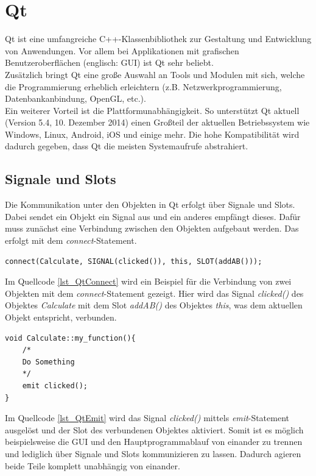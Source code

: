 \section{Qt}
\label{section_Qt}
Qt \cite{qtproject} ist eine umfangreiche C++-Klassenbibliothek zur Gestaltung und Entwicklung von Anwendungen. Vor allem bei Applikationen mit grafischen Benutzeroberflächen (englisch: \ac{GUI}) ist Qt sehr beliebt. \\
Zusätzlich bringt Qt eine große Auswahl an Tools und Modulen mit sich, welche die Programmierung erheblich erleichtern (z.B. Netzwerkprogrammierung, Datenbankanbindung, OpenGL, etc.). \\
Ein weiterer Vorteil ist die Plattformunabhängigkeit. So unterstützt Qt aktuell (Version 5.4, 10. Dezember 2014) einen Großteil der aktuellen Betriebssystem wie Windows, Linux, Android, iOS und einige mehr. Die hohe Kompatibilität wird dadurch gegeben, dass Qt die meisten Systemaufrufe abstrahiert.

\subsection{Signale und Slots}
\label{QtSignaleSlots}
Die Kommunikation unter den Objekten in Qt erfolgt über Signale und Slots. Dabei sendet ein Objekt ein Signal aus und ein anderes empfängt dieses. Dafür muss zunächst eine Verbindung zwischen den Objekten aufgebaut werden. Das erfolgt mit dem \textit{connect}-Statement.\\

\begin{lstlisting}[caption={Qt \textit{connect}-Statement},label=lst_QtConnect]
connect(Calculate, SIGNAL(clicked()), this, SLOT(addAB()));
\end{lstlisting}

Im Quellcode \ref{lst_QtConnect} wird ein Beispiel für die Verbindung von zwei Objekten mit dem \textit{connect}-Statement gezeigt. Hier wird das Signal \textit{clicked()} des Objektes \textit{Calculate} mit dem Slot \textit{addAB()} des Objektes \textit{this}, was dem aktuellen Objekt entspricht, verbunden. \\

\begin{lstlisting}[caption={Qt \textit{emit}-Statement},label=lst_QtEmit]
void Calculate::my_function(){
	/*
	Do Something
	*/
	emit clicked();	
}
\end{lstlisting}

Im Quellcode \ref{lst_QtEmit} wird das Signal \textit{clicked()} mittels \textit{emit}-Statement ausgelöst und der Slot des verbundenen Objektes aktiviert. Somit ist es möglich beispielsweise die GUI und den Hauptprogrammablauf von einander zu trennen und lediglich über Signale und Slots kommunizieren zu lassen. Dadurch agieren beide Teile komplett unabhängig von einander.

